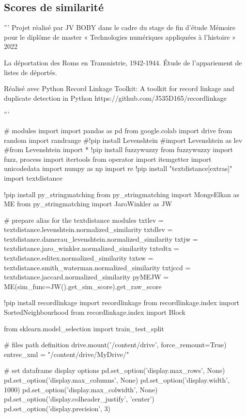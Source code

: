 \documentclass[a4paper,12pt,twoside]{book}
\begin{document}
            \subsection{Scores de similarité}
    		    \label{full_code}
    		    \begin{python}
'''
Projet réalisé par JV BOBY dans le cadre du stage de fin d'étude
Mémoire pour le diplôme de master « Technologies numériques appliquées à l’histoire »
2022

La déportation des Roms en Transnistrie, 1942-1944.
Étude de l’appariement de listes de déportés.

Réalisé avec Python Record Linkage Toolkit:
A toolkit for record linkage and duplicate detection in Python
https://github.com/J535D165/recordlinkage

'''

# modules import  
import pandas as pd
from google.colab import drive
from random import randrange
#!pip install Levenshtein
#import Levenshtein as lev
#from Levenshtein import *
!pip install fuzzywuzzy
from fuzzywuzzy import fuzz, process
import itertools
from operator import itemgetter
import unicodedata
import numpy as np
import re
!pip install "textdistance[extras]"
import textdistance

!pip install py_stringmatching
from py_stringmatching import MongeElkan as ME
from py_stringmatching import JaroWinkler as JW

# prepare alias for the textdistance modules
txtlev = textdistance.levenshtein.normalized_similarity
txtdlev = textdistance.damerau_levenshtein.normalized_similarity
txtjw = textdistance.jaro_winkler.normalized_similarity
txtedtx = textdistance.editex.normalized_similarity
txtsw = textdistance.smith_waterman.normalized_similarity
txtjccd = textdistance.jaccard.normalized_similarity
pyMEJW = ME(sim_func=JW().get_sim_score).get_raw_score

!pip install recordlinkage
import recordlinkage
from recordlinkage.index import SortedNeighbourhood
from recordlinkage.index import Block

from sklearn.model_selection import train_test_split

# files path definition
drive.mount('/content/drive', force_remount=True)
entree_xml = "/content/drive/MyDrive/"

# set dataframe display options
pd.set_option('display.max_rows', None)
pd.set_option('display.max_columns', None)
pd.set_option('display.width', 1000)
pd.set_option('display.max_colwidth', None)
pd.set_option('display.colheader_justify', 'center')
pd.set_option('display.precision', 3)


\end{python}
\end{document}
